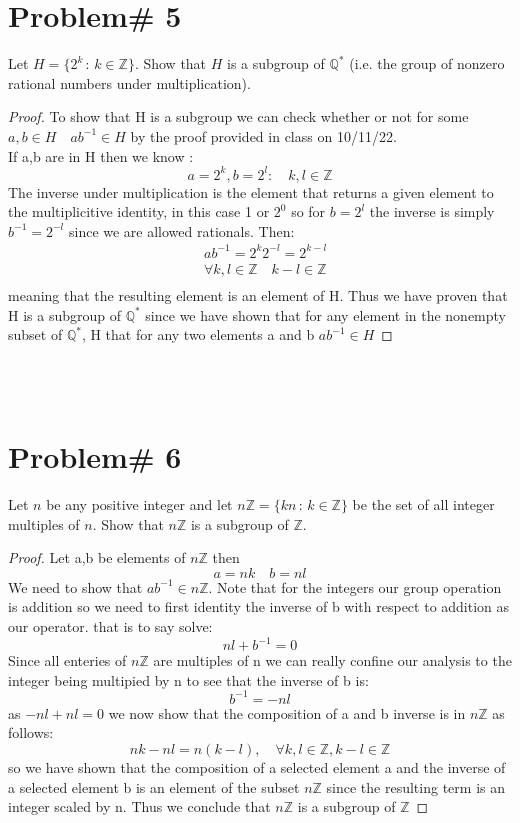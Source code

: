 \documentclass[11pt]{article}
\theoremstyle{definition}  %
\newcommand{\Z}{\mathbb{Z}}
\newcommand{\Q}{\mathbb{Q}}
\newcommand{\bigline}{\\\noindent\makebox[\linewidth]{\rule{\paperwidth}{0.4pt}}\\}
\begin{document}
\section* {Problem# 5}
 Let $H = \{ 2^k \, :\, k \in \Z\}$. Show that $H$ is a subgroup of $\Q^*$ (i.e. the group of nonzero rational numbers under multiplication).
\begin{proof}
To show that H is  a subgroup we can check whether or not for some $a,b\in H\quad ab^{-1}\in H$ by the proof provided in class on 10/11/22.\\
If a,b are in H then we know :
\[
  a=2^k, b=2^l: \quad k,l \in \Z
\]
The inverse under multiplication is the element that returns a given element to the multiplicitive identity, in this case 1 or $2^0$ so for $b=2^l$ the inverse is simply $b^{-1}=2^{-l}$ since we are allowed rationals. Then:
\begin{align*}
  &ab^{-1}=2^k2^{-l}=2^{k-l}\\
  &\forall k, l \in \Z \quad k-l \in \Z\\
\end{align*}
meaning that the resulting element is an element of H. Thus we have proven that H is a subgroup of $\Q^*$ since we have shown that for any element in the nonempty subset of $\Q^*$, H that for any two elements a and b $ab^{-1}\in H$
\end{proof}
\bigline
\section* {Problem# 6}Let $n$ be any positive integer and let $n\Z = \{kn \, : \, k \in \Z\}$ be the set of all integer multiples of $n$. Show that $n\Z$ is a subgroup of $\Z$.
\begin{proof}
Let a,b be elements of $n\Z$ then \[
  a=nk\quad b=nl
\]
We need to show that $ab^{-1}\in n\Z$. Note that for the integers our group operation is addition so we need to first identity the inverse of b with respect to addition as our operator. that is to say solve:
\[
  nl+b^{-1}=0
\]
Since all enteries of $n\Z$ are multiples of n we can really confine our analysis to the integer being multipied by n to see that the inverse of b is:
\[
  b^{-1}=-nl
\]
as $-nl+nl=0$
we now show that the composition of a and b inverse is in $n\Z$ as follows:
\[
  nk-nl=n(k-l),\quad \forall k,l \in \Z, k-l\in \Z
\]
so we have shown that the composition of a selected element a and the inverse of a selected element b is an element of the subset $n\Z$ since the resulting term is an integer scaled by n. Thus we conclude that $n\Z$ is a subgroup of $\Z$
\end{proof}
\bigline
\end{document}
